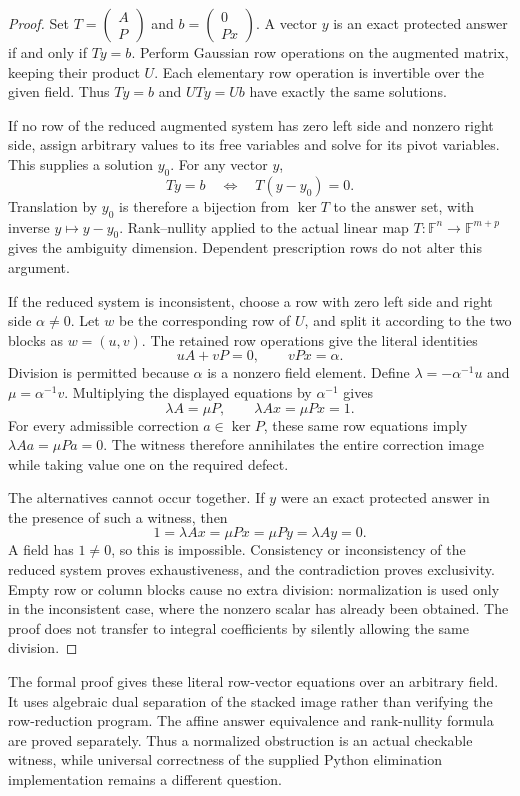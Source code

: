 \begin{proof}
Set \(T=\begin{pmatrix}A\\P\end{pmatrix}\) and \(b=\begin{pmatrix}0\\Px\end{pmatrix}\). A vector \(y\) is an exact protected answer if and only if \(Ty=b\). Perform Gaussian row operations on the augmented matrix, keeping their product \(U\). Each elementary row operation is invertible over the given field. Thus \(Ty=b\) and \(UTy=Ub\) have exactly the same solutions.

If no row of the reduced augmented system has zero left side and nonzero right side, assign arbitrary values to its free variables and solve for its pivot variables. This supplies a solution \(y_0\). For any vector \(y\),
\[
 Ty=b\quad\Longleftrightarrow\quad T(y-y_0)=0.
\]
Translation by \(y_0\) is therefore a bijection from \(\ker T\) to the answer set, with inverse \(y\mapsto y-y_0\). Rank--nullity applied to the actual linear map \(T:\mathbb F^n\to\mathbb F^{m+p}\) gives the ambiguity dimension. Dependent prescription rows do not alter this argument.

If the reduced system is inconsistent, choose a row with zero left side and right side \(\alpha\ne0\). Let \(w\) be the corresponding row of \(U\), and split it according to the two blocks as \(w=(u,v)\). The retained row operations give the literal identities
\[
 uA+vP=0,\qquad vPx=\alpha.
\]
Division is permitted because \(\alpha\) is a nonzero field element. Define \(\lambda=-\alpha^{-1}u\) and \(\mu=\alpha^{-1}v\). Multiplying the displayed equations by \(\alpha^{-1}\) gives
\[
 \lambda A=\mu P,\qquad \lambda Ax=\mu Px=1.
\]
For every admissible correction \(a\in\ker P\), these same row equations imply \(\lambda Aa=\mu Pa=0\). The witness therefore annihilates the entire correction image while taking value one on the required defect.

The alternatives cannot occur together. If \(y\) were an exact protected answer in the presence of such a witness, then
\[
 1=\lambda Ax=\mu Px=\mu Py=\lambda Ay=0.
\]
A field has \(1\ne0\), so this is impossible. Consistency or inconsistency of the reduced system proves exhaustiveness, and the contradiction proves exclusivity. Empty row or column blocks cause no extra division: normalization is used only in the inconsistent case, where the nonzero scalar has already been obtained. The proof does not transfer to integral coefficients by silently allowing the same division.
\end{proof}
The formal proof gives these literal row-vector equations over an arbitrary field. It uses algebraic dual separation of the stacked image rather than verifying the row-reduction program. The affine answer equivalence and rank-nullity formula are proved separately. Thus a normalized obstruction is an actual checkable witness, while universal correctness of the supplied Python elimination implementation remains a different question.

